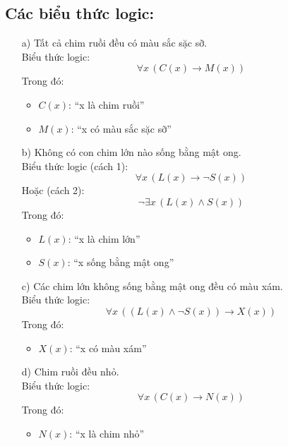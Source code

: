 \documentclass[11pt, oneside,openright,a4paper]{book}
\begin{document}
\subsection*{Các biểu thức logic:}
\begin{itemize}
    \item[a)] Tất cả chim ruồi đều có màu sắc sặc sỡ.\\
    Biểu thức logic:
    \[
    \forall x \, (C(x) \rightarrow M(x))
    \]
    Trong đó:
    \begin{itemize}
        \item $C(x)$: ``x là chim ruồi''
        \item $M(x)$: ``x có màu sắc sặc sỡ''
    \end{itemize}

    \item[b)] Không có con chim lớn nào sống bằng mật ong.\\
    Biểu thức logic (cách 1):
    \[
    \forall x \, (L(x) \rightarrow \neg S(x))
    \]
    Hoặc (cách 2):
    \[
    \neg \exists x \, (L(x) \land S(x))
    \]
    Trong đó:
    \begin{itemize}
        \item $L(x)$: ``x là chim lớn''
        \item $S(x)$: ``x sống bằng mật ong''
    \end{itemize}

    \item[c)] Các chim lớn không sống bằng mật ong đều có màu xám.\\
    Biểu thức logic:
    \[
    \forall x \, ((L(x) \land \neg S(x)) \rightarrow X(x))
    \]
    Trong đó:
    \begin{itemize}
        \item $X(x)$: ``x có màu xám''
    \end{itemize}

    \item[d)] Chim ruồi đều nhỏ.\\
    Biểu thức logic:
    \[
    \forall x \, (C(x) \rightarrow N(x))
    \]
    Trong đó:
    \begin{itemize}
        \item $N(x)$: ``x là chim nhỏ''
    \end{itemize}
\end{itemize}
\end{document}
